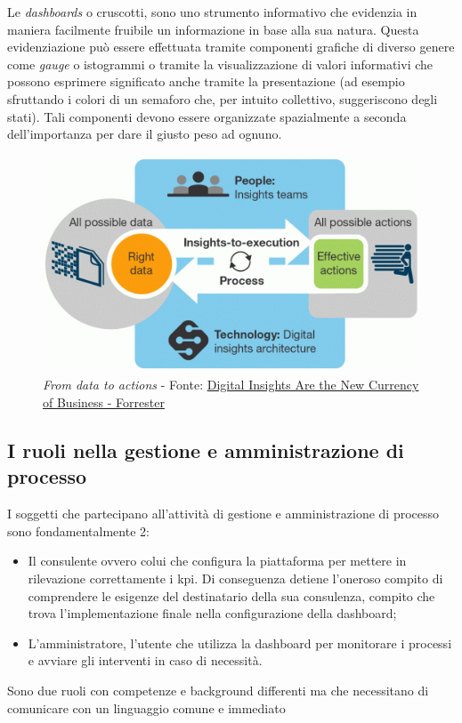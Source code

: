 Le \textit{dashboards} o cruscotti, sono uno strumento informativo che evidenzia in maniera facilmente fruibile un informazione in base alla sua natura. Questa evidenziazione può essere effettuata tramite componenti grafiche di diverso genere come \textit{gauge} o istogrammi o tramite la visualizzazione di valori informativi che possono esprimere significato  anche tramite la presentazione (ad esempio sfruttando i colori di un semaforo che, per intuito collettivo, suggeriscono degli stati).
Tali componenti devono essere organizzate spazialmente a seconda dell'importanza per dare il giusto peso ad ognuno.
\begin{figure}[H]
    \centering
    \includegraphics[width=0.80\columnwidth]{immagini/from_data_to_insight.png}
    \caption{\textit{From data to actions} - Fonte: \href{https://go.forrester.com/blogs/15-04-27-digital_insights_are_the_new_currency_of_business/}{Digital Insights Are the New Currency of Business - Forrester}}
    \label{fig:my_label}
\end{figure}
\subsection{I ruoli nella gestione e amministrazione di processo}
I soggetti che partecipano all'attività di gestione e amministrazione di processo sono fondamentalmente 2:
\begin{itemize}
    \item Il consulente ovvero colui che configura la piattaforma per mettere in rilevazione correttamente i \acrshort{kpi}. Di conseguenza detiene l'oneroso compito di comprendere le esigenze del destinatario della sua consulenza, compito che trova l'implementazione finale nella configurazione della dashboard;
    \item L'amministratore, l'utente che utilizza la dashboard per monitorare i processi e avviare gli interventi in caso di necessità.
\end{itemize}
Sono due ruoli con competenze e background differenti ma che necessitano di comunicare con un linguaggio comune e immediato
